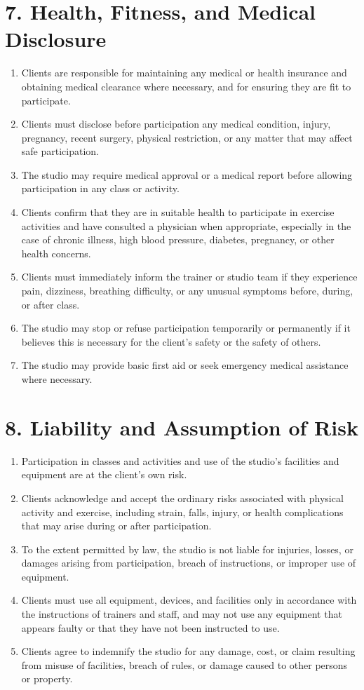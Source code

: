 \documentclass[12pt,a4paper]{article}
\begin{document}
\section*{7. Health, Fitness, and Medical Disclosure}
\begin{enumerate}
    \item Clients are responsible for maintaining any medical or health insurance and obtaining medical clearance where necessary, and for ensuring they are fit to participate.
    \item Clients must disclose before participation any medical condition, injury, pregnancy, recent surgery, physical restriction, or any matter that may affect safe participation.
    \item The studio may require medical approval or a medical report before allowing participation in any class or activity.
    \item Clients confirm that they are in suitable health to participate in exercise activities and have consulted a physician when appropriate, especially in the case of chronic illness, high blood pressure, diabetes, pregnancy, or other health concerns.
    \item Clients must immediately inform the trainer or studio team if they experience pain, dizziness, breathing difficulty, or any unusual symptoms before, during, or after class.
    \item The studio may stop or refuse participation temporarily or permanently if it believes this is necessary for the client’s safety or the safety of others.
    \item The studio may provide basic first aid or seek emergency medical assistance where necessary.
\end{enumerate}

\section*{8. Liability and Assumption of Risk}
\begin{enumerate}
    \item Participation in classes and activities and use of the studio’s facilities and equipment are at the client’s own risk.
    \item Clients acknowledge and accept the ordinary risks associated with physical activity and exercise, including strain, falls, injury, or health complications that may arise during or after participation.
    \item To the extent permitted by law, the studio is not liable for injuries, losses, or damages arising from participation, breach of instructions, or improper use of equipment.
    \item Clients must use all equipment, devices, and facilities only in accordance with the instructions of trainers and staff, and may not use any equipment that appears faulty or that they have not been instructed to use.
    \item Clients agree to indemnify the studio for any damage, cost, or claim resulting from misuse of facilities, breach of rules, or damage caused to other persons or property.
\end{enumerate}
\end{document}
